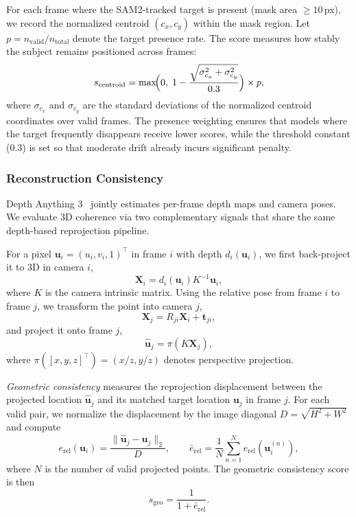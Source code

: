 For each frame where the SAM2-tracked target is present (mask area $\geq 10$\,px), we record the normalized centroid $(c_x, c_y)$ within the mask region.
Let $p = n_{\text{valid}} / n_{\text{total}}$ denote the target presence rate.
The score measures how stably the subject remains positioned across frames:
\begin{equation}
  s_{\text{centroid}} = \max\!\Bigl(0,\; 1 - \frac{\sqrt{\sigma_{c_x}^2 + \sigma_{c_y}^2}}{0.3}\Bigr) \times p,
\end{equation}
where $\sigma_{c_x}$ and $\sigma_{c_y}$ are the standard deviations of the normalized centroid coordinates over valid frames.
The presence weighting ensures that models where the target frequently disappears receive lower scores, while the threshold constant ($0.3$) is set so that moderate drift already incurs significant penalty.


\subsubsection{Reconstruction Consistency}
\label{app:reconstruction_detail}

Depth Anything 3~\cite{lin2025depthanything3} jointly estimates per-frame depth maps and camera poses.
We evaluate 3D coherence via two complementary signals that share the same depth-based reprojection pipeline.

For a pixel $\mathbf{u}_i = (u_i, v_i, 1)^\top$ in frame $i$ with depth $d_i(\mathbf{u}_i)$, we first back-project it to 3D in camera $i$,
\begin{equation}
  \mathbf{X}_i = d_i(\mathbf{u}_i) K^{-1} \mathbf{u}_i,
\end{equation}
where $K$ is the camera intrinsic matrix.
Using the relative pose from frame $i$ to frame $j$, we transform the point into camera $j$,
\begin{equation}
  \mathbf{X}_j = R_{ji} \mathbf{X}_i + \mathbf{t}_{ji},
\end{equation}
and project it onto frame $j$,
\begin{equation}
  \hat{\mathbf{u}}_j = \pi(K \mathbf{X}_j),
\end{equation}
where $\pi([x, y, z]^\top) = (x/z, y/z)$ denotes perspective projection.

\emph{Geometric consistency} measures the reprojection displacement between the projected location $\hat{\mathbf{u}}_j$ and its matched target location $\mathbf{u}_j$ in frame $j$.
For each valid pair, we normalize the displacement by the image diagonal $D = \sqrt{H^2 + W^2}$ and compute
\begin{equation}
  e_{\mathrm{rel}}(\mathbf{u}_i) = \frac{\lVert \hat{\mathbf{u}}_j - \mathbf{u}_j \rVert_2}{D},
  \qquad
  \bar{e}_{\mathrm{rel}} = \frac{1}{N} \sum_{n=1}^{N} e_{\mathrm{rel}}(\mathbf{u}_i^{(n)}),
\end{equation}
where $N$ is the number of valid projected points.
The geometric consistency score is then
\begin{equation}
  s_{\mathrm{geo}} = \frac{1}{1 + \bar{e}_{\mathrm{rel}}}.
\end{equation}

